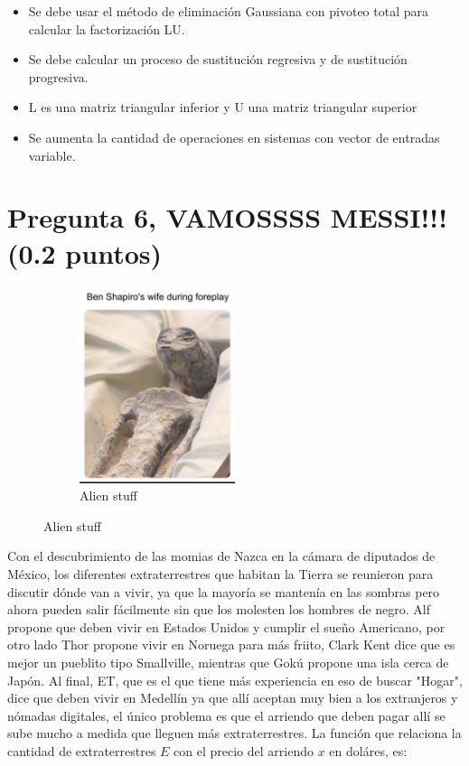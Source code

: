 \begin{itemize}
    \item Se debe usar el método de eliminación Gaussiana con pivoteo total para calcular  la factorización LU.
    \item Se debe calcular un proceso de sustitución regresiva y de sustitución progresiva. \checkmark
    \item L es una matriz triangular inferior y U una matriz triangular superior \checkmark
    \item Se aumenta la cantidad de operaciones en sistemas con vector de entradas variable.
\end{itemize}

\section{Pregunta 6, VAMOSSSS MESSI!!! (0.2 puntos)}

\begin{figure}[H]
    \centering
    \begin{subfigure}[b]{0.5\textwidth}
        \centering
        \includegraphics[width=0.5\textwidth]{Figures/0. General/ALIEN.jpg}
        \caption{Alien stuff}
        \label{fig: Nasca Alien}
    \end{subfigure}
\end{figure}

Con el descubrimiento de las momias de Nazca en la cámara de diputados de
México, los diferentes extraterrestres que habitan la Tierra se reunieron para
discutir dónde van a vivir, ya que la mayoría se mantenía en las sombras pero
ahora pueden salir fácilmente sin que los molesten los hombres de negro. Alf
propone que deben vivir en Estados Unidos y cumplir el sueño Americano, por
otro lado Thor propone vivir en Noruega para más friito, Clark Kent dice que es
mejor un pueblito tipo Smallville, mientras que Gokú propone una isla cerca de
Japón. Al final, ET, que es el que tiene más experiencia en eso de buscar
"Hogar", dice que deben vivir en Medellín ya que allí aceptan muy bien a los
extranjeros y nómadas digitales, el único problema es que el arriendo que deben
pagar allí se sube mucho a medida que lleguen más extraterrestres.
La función que relaciona la cantidad de extraterrestres $E$ con el precio del
arriendo $x$ en doláres, es:


